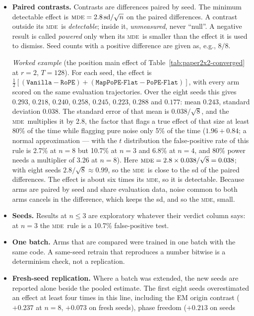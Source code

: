 \documentclass[10pt]{article}
\newcommand{\mde}{\textsc{mde}}
\newcommand{\arm}[1]{\texttt{#1}}
\begin{document}
\begin{itemize}
\item \textbf{Paired contrasts.} Contrasts are differences paired by seed. The minimum detectable
effect is $\mde = 2.8\,\mathrm{sd}/\sqrt{n}$ on the paired differences. A contrast outside its \mde\
is \emph{detectable}; inside it, \emph{unmeasured}, never ``null''. A negative result is called
\emph{powered} only when its \mde\ is smaller than the effect it is used to dismiss. Seed counts
with a positive difference are given as, e.g., $8/8$.

\emph{Worked example} (the position main effect of Table~\ref{tab:paper2x2-converged} at $r=2$, $T=128$). For each
seed, the effect is $\tfrac12[(\arm{Vanilla}-\arm{RoPE}) + (\arm{MapPoPE-Flat}-\arm{PoPE-Flat})]$, with every arm
scored on the same evaluation trajectories. Over the eight seeds this gives $0.293$, $0.218$, $0.240$, $0.258$,
$0.245$, $0.223$, $0.288$ and $0.177$: mean $0.243$, standard deviation $0.038$. The standard error of that mean is
$0.038/\sqrt8$, and the \mde\ multiplies it by 2.8, the factor that flags a true effect of that size at least 80\% of
the time while flagging pure noise only 5\% of the time ($1.96+0.84$; a normal approximation --- with the $t$
distribution the false-positive rate of this rule is 2.7\% at $n=8$ but 10.7\% at $n=3$ and 6.8\% at $n=4$, and
80\% power needs a multiplier of 3.26 at $n=8$). Here $\mde = 2.8\times0.038/\sqrt8 = 0.038$;
with eight seeds $2.8/\sqrt8\approx0.99$, so the \mde\ is close to the sd of the paired differences. The effect is
about six times its \mde, so it is detectable. Because arms are paired by seed and share evaluation data, noise common
to both arms cancels in the difference, which keeps the sd, and so the \mde, small.
\item \textbf{Seeds.} Results at $n\le3$ are exploratory whatever their verdict column says: at $n=3$ the
\mde\ rule is a 10.7\% false-positive test.
\item \textbf{One batch.} Arms that are compared were trained in one batch with the same code. A
same-seed retrain that reproduces a number bitwise is a determinism check, not a replication.
\item \textbf{Fresh-seed replication.} Where a batch was extended, the new seeds are reported alone
beside the pooled estimate. The first eight seeds overestimated an effect at least four times in this line,
including the
EM origin contrast ($+0.237$ at $n=8$, $+0.073$ on fresh seeds), phase freedom ($+0.213$ on seeds

\end{itemize}
\end{document}

